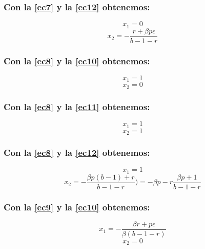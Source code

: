 \documentclass[11pt]{article}
\begin{document}
\subsubsection*{Con la \autoref{ec7} y la \autoref{ec12} obtenemos:}
\vspace{-0.7cm}
\begin{equation}\label{ec17}
x_1=0
\end{equation}
\begin{equation}\label{ec18}
x_2=-\dfrac{r+\beta p\epsilon}{b-1-r}
\end{equation}


\subsubsection*{Con la \autoref{ec8} y la \autoref{ec10} obtenemos:}
\vspace{-0.7cm}
\begin{equation}\label{ec19}
x_1=1
\end{equation}
\begin{equation}\label{ec20}
x_2=0
\end{equation}

\subsubsection*{Con la \autoref{ec8} y la \autoref{ec11} obtenemos:}
\vspace{-0.7cm}
\begin{equation}\label{ec21}
x_1=1
\end{equation}
\begin{equation}\label{ec22}
x_2=1
\end{equation}

\subsubsection*{Con la \autoref{ec8} y la \autoref{ec12} obtenemos:}
\vspace{-0.7cm}
\begin{equation}\label{ec23}
x_1=1
\end{equation}
\begin{equation}\label{ec24}
x_2=-\dfrac{\beta p(b-1)+r}{b-1-r})=-\beta p-r\dfrac{\beta p+1}{b-1-r}
\end{equation}


\subsubsection*{Con la \autoref{ec9} y la \autoref{ec10} obtenemos:}
\vspace{-0.5cm}
\begin{equation}\label{ec25}
x_1=-\dfrac{\beta r+p\epsilon}{\beta(b-1-r)}
\end{equation}
\begin{equation}\label{ec26}
x_2=0
\end{equation}
\end{document}
